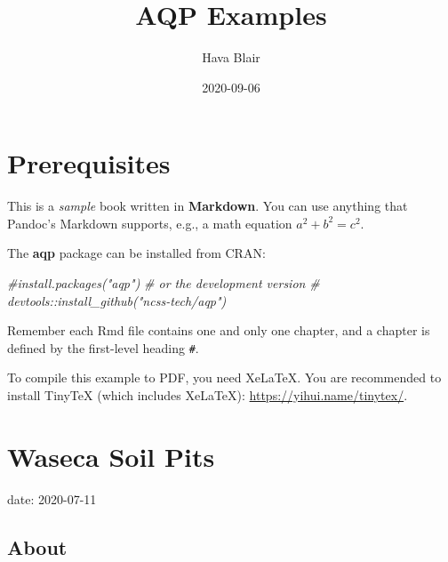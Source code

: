 \documentclass[
]{book}
\title{AQP Examples}
\author{Hava Blair}
\date{2020-09-06}
\newenvironment{Shaded}{\begin{snugshade}}{\end{snugshade}}
\newcommand{\CommentTok}[1]{\textcolor[rgb]{0.56,0.35,0.01}{\textit{#1}}}
\newcommand{\DataTypeTok}[1]{\textcolor[rgb]{0.13,0.29,0.53}{#1}}
\newcommand{\KeywordTok}[1]{\textcolor[rgb]{0.13,0.29,0.53}{\textbf{#1}}}
\newcommand{\NormalTok}[1]{#1}
\newcommand{\OperatorTok}[1]{\textcolor[rgb]{0.81,0.36,0.00}{\textbf{#1}}}
\newcommand{\OtherTok}[1]{\textcolor[rgb]{0.56,0.35,0.01}{#1}}
\begin{document}
\maketitle

{
\setcounter{tocdepth}{1}
\tableofcontents
}
\hypertarget{prerequisites}{%
\chapter{Prerequisites}\label{prerequisites}}

This is a \emph{sample} book written in \textbf{Markdown}. You can use anything that Pandoc's Markdown supports, e.g., a math equation \(a^2 + b^2 = c^2\).

The \textbf{aqp} package can be installed from CRAN:

\begin{Shaded}
\begin{Highlighting}[]
\CommentTok{\#install.packages("aqp")}
\CommentTok{\# or the development version}
\CommentTok{\# devtools::install\_github("ncss{-}tech/aqp")}
\end{Highlighting}
\end{Shaded}

Remember each Rmd file contains one and only one chapter, and a chapter is defined by the first-level heading \texttt{\#}.

To compile this example to PDF, you need XeLaTeX. You are recommended to install TinyTeX (which includes XeLaTeX): \url{https://yihui.name/tinytex/}.

\hypertarget{waseca-soil-pits}{%
\chapter{Waseca Soil Pits}\label{waseca-soil-pits}}

date: 2020-07-11

\begin{Shaded}
\end{Shaded}

\hypertarget{about}{%
\section{About}\label{about}}
\end{document}
